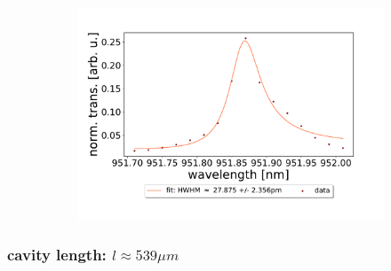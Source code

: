 \begin{figure}[h!]
\begin{subfigure}[b]{0.49\textwidth}
        \includegraphics[width=\textwidth]{figures/results/double fano fits/1000um_M3:M5_fit_5.pdf}
        \caption{}
        \label{fig:1000um_M3:M5_fit_5}
    \end{subfigure}
\end{figure}

\clearpage
\subsubsection*{cavity length: $l \approx 539 \mu m$}

